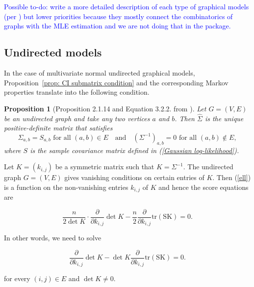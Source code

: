 \documentclass[10pt,a4paper]{article}
\newtheorem{proposition}{Proposition}
\begin{document}
\textcolor{blue}{Possible to-do: write a more detailed description of each type of graphical models (per \cite[Chapter 3]{drton2008lectures}) but lower priorities because they mostly connect the combinatorics of graphs with the MLE estimation and we are not doing that in the package.}

\subsection{Undirected models}
In the case of multivariate normal undirected graphical models, Proposition~\ref{prop: CI submatrix condition} and the corresponding Markov properties translate into the following condition.

\begin{proposition}[Proposition 2.1.14 and Equation 3.2.2. from \cite{drton2008lectures}]
Let $G=(V,E)$ be an undirected graph and take any two vertices $a$ and $b$. Then $\hat{\Sigma}$ is the unique positive-definite matrix that satisfies
\[\Sigma_{a,b}=S_{a,b} \mbox{ for all $(a,b)\in E$}\quad \text{and}\quad \left(\Sigma^{-1}\right)_{a,b}=0 \mbox{ for all $(a,b)\notin E$},\]
where $S$ is the sample covariance matrix defined in (\ref{Gaussian log-likelihood}).

\end{proposition}

Let $K=(k_{i,j})$ be a symmetric matrix such that $K=\Sigma^{-1}$. The undirected graph $G=(V,E)$ gives vanishing conditions on certain entries of $K$. Then (\ref{ell}) is a function on the non-vanishing entries $k_{i,j}$ of $K$ and hence the score equations are 

$$\frac{n}{2\det K}\cdot\frac{\partial}{\partial k_{i,j}} \det K-\frac{n}{2}\frac{\partial }{\partial k_{i,j}}\operatorname{tr(S K)}=0.$$

In other words, we need to solve 

$$\frac{\partial}{\partial k_{i,j}} \det K-\det K\frac{\partial }{\partial k_{i,j}}\operatorname{tr(S K)}=0.$$

\noindent for every $(i,j)\in E$ and $\det K\neq 0$.
\end{document}

